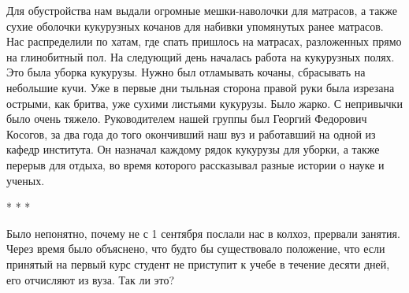 Для обустройства нам выдали огромные мешки-наволочки для матрасов, а также
сухие оболочки кукурузных кочанов для набивки упомянутых ранее матрасов. Нас
распределили по хатам, где спать пришлось на матрасах, разложенных прямо на
глинобитный пол. На следующий день началась работа на кукурузных полях. Это
была уборка кукурузы. Нужно был отламывать кочаны, сбрасывать на небольшие
кучи. Уже в первые дни тыльная сторона правой руки была изрезана острыми, как
бритва, уже сухими листьями кукурузы. Было жарко. С непривычки было очень
тяжело. Руководителем нашей группы был Георгий Федорович Косогов, за два года
до того окончивший наш вуз и работавший на одной из кафедр института. Он
назначал каждому рядок кукурузы для уборки, а также перерыв для отдыха, во
время которого рассказывал разные истории о науке и ученых.

* * *

Было непонятно, почему не с 1 сентября послали нас в колхоз, прервали занятия.
Через время было объяснено, что будто бы существовало положение, что если
принятый на первый курс студент не приступит к учебе в течение десяти дней, его
отчисляют из вуза. Так ли это?
